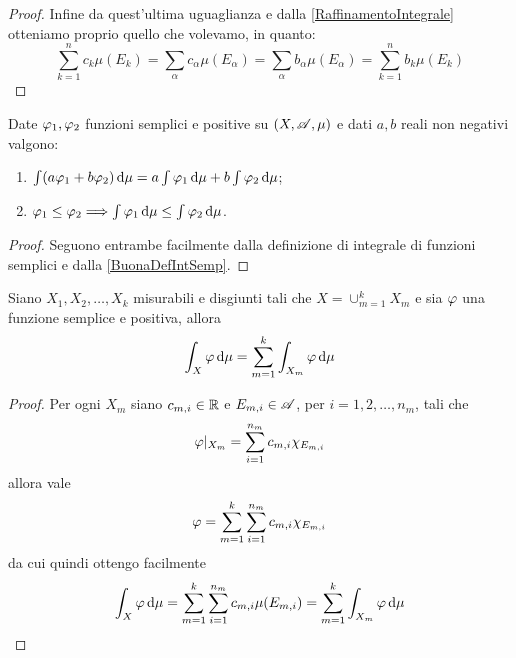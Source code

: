 \begin{proof}
	Infine da quest'ultima uguaglianza e dalla \cref{RaffinamentoIntegrale} otteniamo proprio quello che volevamo, in quanto:
	\begin{equation*}
		\sum_{k=1}^n c_k \mu(E_k)=\sum_\alpha c_\alpha\mu(E_\alpha)=\sum_\alpha b_\alpha\mu(E_\alpha)=\sum_{k=1}^n b_k \mu(E_k)
	\end{equation*}
\end{proof}

\begin{proposition}\label{PropIntSemp}
	Date $\varphi_1,\varphi_2$ funzioni semplici e positive su $(X,\mathscr A,\mu)$ e dati $a,b$ reali non negativi valgono:
	\begin{enumerate}
		\item $\int (a\varphi_1+b\varphi_2)\,\mathrm d\mu=a\int \varphi_1\,\mathrm d\mu+b\int \varphi_2\,\mathrm d\mu$; \label{PIS:add}
		\item $\varphi_1\le \varphi_2\Longrightarrow \int \varphi_1\,\mathrm d\mu\le \int \varphi_2\,\mathrm d\mu$. \label{PIS:mono}
	\end{enumerate}
\end{proposition}
\begin{proof}
	Seguono entrambe facilmente dalla definizione di integrale di funzioni semplici e dalla \cref{BuonaDefIntSemp}.
\end{proof}

\begin{proposition}\label{IntSempSpezzato}
	Siano $X_1,X_2,\dots,X_k$ misurabili e disgiunti tali che $X=\cup_{m=1}^kX_m$ e sia $\varphi$ una funzione semplice e positiva, allora
	\begin{equation*}
		\int_X \varphi \,\mathrm d \mu=\sum_{m=1}^k \int_{X_m}\varphi\,\mathrm d \mu
	\end{equation*}
\end{proposition}
\begin{proof}
	Per ogni $X_m$ siano $c_{m,i}\in\mathbb R$ e $E_{m,i}\in\mathscr A$, per $i=1,2,\dots,n_m$, tali che 
	\begin{equation*}
		\varphi|_{X_m}=\sum_{i=1}^{n_m}c_{m,i}\chi_{E_{m,i}}
	\end{equation*}
	allora vale
	\begin{equation*}
		\varphi=\sum_{m=1}^k\sum_{i=1}^{n_m}c_{m,i}\chi_{E_{m,i}}
	\end{equation*}
	da cui quindi ottengo facilmente
	\begin{equation*}
		\int_X \varphi \,\mathrm d \mu=\sum_{m=1}^k\sum_{i=1}^{n_m}c_{m,i}\mu(E_{m,i})=\sum_{m=1}^k\int_{X_m}\varphi\,\mathrm d \mu
	\end{equation*}

\end{proof}



